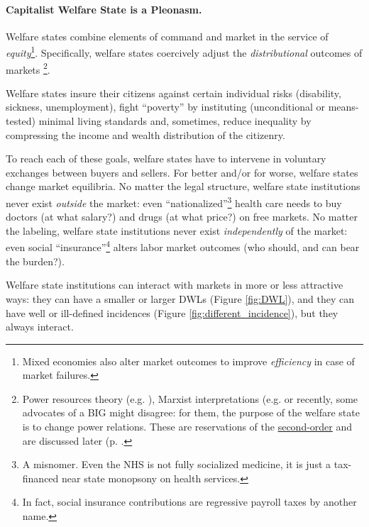\paragraph{Capitalist Welfare State is a Pleonasm.}  \label{sec:interface} Welfare states combine elements of  command and market in the service of \emph{equity}\footnote
	{Mixed economies also alter market outcomes to improve \emph{efficiency} in case of market failures.}. 
Specifically, welfare states coercively adjust the \emph{distributional} outcomes of markets \footnote
	{Power resources theory (e.g. \citealt{Korpi2003}), Marxist interpretations (e.g. \cite{Offe1972} or recently, some advocates of a \gls{BIG} might disagree: for them, the purpose of the welfare state is to change power relations. These are reservations of the \hyperref[sec:who_dunnit]{second-order} and are discussed later (p. \pageref{sec:who_dunnit}.}.

Welfare states insure their citizens against certain individual risks (disability, sickness, unemployment), fight ``poverty'' by instituting (unconditional or means-tested) minimal living standards and, sometimes, reduce inequality by compressing the income and wealth distribution of the citizenry.

To reach each of these goals, welfare states have to intervene in voluntary exchanges between buyers and sellers. For better and/or for worse, welfare states change market equilibria. No matter the legal structure, welfare state institutions never exist \emph{outside} the market: even ``nationalized''\footnote
	{A misnomer. Even the \gls{NHS} is not fully socialized medicine, it is just a tax-financed near state monopsony on health services.} 
health care needs to buy doctors (at what salary?) and drugs (at what price?) on free markets. No matter the labeling, welfare state institutions never exist \emph{independently} of the market: even social ``insurance''\footnote
	{In fact, social insurance contributions are regressive payroll taxes by another name.} alters labor market outcomes (who should, and can bear the burden?). 

Welfare state institutions can interact with markets in more or less attractive ways: they can have a smaller or larger \glspl{DWL} (Figure \ref{fig:DWL}), and they can have well or ill-defined incidences (Figure \ref{fig:different_incidence}), but they always interact.%

